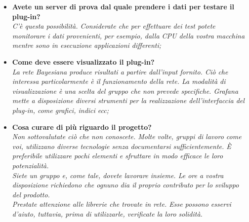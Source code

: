 \begin{itemize}
\item\textbf{Avete un server di prova dal quale prendere i dati per testare il plug-in?}\\
\emph{C'è questa possibilità. Considerate che per effettuare dei test potete monitorare i dati provenienti, per esempio, dalla CPU della vostra macchina mentre sono in esecuzione applicazioni differenti;}

\item\textbf{Come deve essere visualizzato il plug-in?}\\
\emph{La rete Bayesiana produce risultati a partire dall'input fornito. Ciò che interessa particolarmente è il funzionamento della rete. La modalità di visualizzazione è una scelta del gruppo che non prevede specifiche. Grafana mette a disposizione diversi strumenti per la realizzazione dell'interfaccia del plug-in, come grafici, indici ecc;}

\item\textbf{Cosa curare di più riguardo il progetto?}\\
\emph{Non sottovalutate ciò che non conoscete. Molte volte, gruppi di lavoro come voi, utilizzano diverse tecnologie senza documentarsi sufficientemente. È preferibile utilizzare pochi elementi e sfruttare in modo efficace le loro potenzialità. \\
Siete un gruppo e, come tale, dovete lavorare insieme. Le ore a vostra disposizione richiedono che ognuno dia il proprio contributo per lo sviluppo del prodotto.\\
Prestate attenzione alle librerie che trovate in rete. Esse possono esservi d'aiuto, tuttavia, prima di utilizzarle, verificate la loro solidità.}
\end{itemize}

